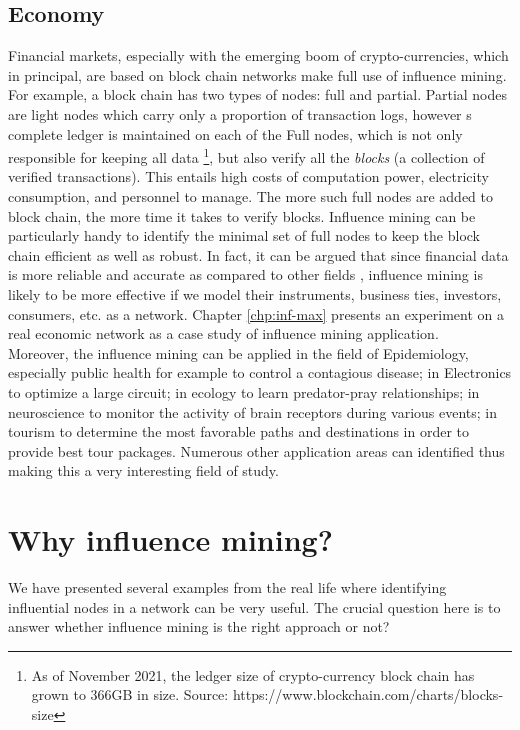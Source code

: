 		\subsection{Economy}
		Financial markets, especially with the emerging boom of crypto-currencies, which in principal, are based on block chain networks make full use of influence mining. For example, a block chain has two types of nodes: full and partial. Partial nodes are light nodes which carry only a proportion of transaction logs, however s complete ledger is maintained on each of the Full nodes, which is not only responsible for keeping all data \footnote{As of November 2021, the ledger size of crypto-currency block chain has grown to 366GB in size. Source: https://www.blockchain.com/charts/blocks-size}, but also verify all the \textit{blocks} (a collection of verified transactions). This entails high costs of computation power, electricity consumption, and personnel to manage. The more such full nodes are added to block chain, the more time it takes to verify blocks. Influence mining can be particularly handy to identify the minimal set of full nodes to keep the block chain efficient as well as robust. In fact, it can be argued that since financial data is more reliable and accurate as compared to other fields \cite{costa2011}, influence mining is likely to be more effective if we model their instruments, business ties, investors, consumers, etc. as a network. Chapter \ref{chp:inf-max} presents an experiment on a real economic network as a case study of influence mining application. \\
	
	Moreover, the influence mining can be applied in the field of Epidemiology, especially public health for example to control a contagious disease; in Electronics to optimize a large circuit; in ecology to learn predator-pray relationships; in neuroscience to monitor the activity of brain receptors during various events; in tourism to determine the most favorable paths and destinations in order to provide best tour packages. Numerous other application areas can identified thus making this a very interesting field of study.


	\section{Why influence mining?}
	We have presented several examples from the real life where identifying influential nodes in a network can be very useful. The crucial question here is to answer whether influence mining is the right approach or not?
	
